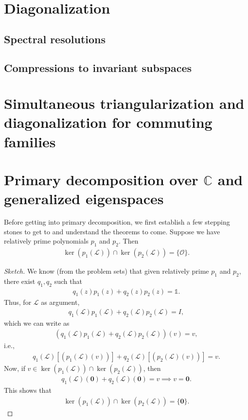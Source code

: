 \documentclass{article}
\theoremstyle{definition}
\newcommand{\lag}{\mathcal{L}}
\begin{document}
\section{Diagonalization}
\subsection{Spectral resolutions}
\subsection{Compressions to invariant subspaces}
\newpage
\section{Simultaneous triangularization and  diagonalization for commuting families}
\newpage
\section{Primary decomposition over $\mathbb{C}$ and generalized eigenspaces}

Before getting into primary decomposition, we first establish a few stepping stones to get to and understand the theorems to come. Suppose we have relatively prime polynomials $p_1$ and $p_2$. Then
\begin{align*}
\ker(p_1(\lag)) \cap \ker(p_2(\lag)) = \{ \mathcal{O} \}.
\end{align*}

\begin{proof}[Sketch]
	We know (from the problem sets) that given relatively prime $p_1$ and $p_2$, there exist $q_1, q_2$ such that 
	\begin{align*}
	q_1(z)p_1(z) + q_2(z)p_2(z) = \mathbb{1}.
	\end{align*}
	Thus, for $\lag$ as argument,
	\begin{align*}
	q_1(\lag)p_1(\lag) + q_2(\lag)p_2(\lag) = I,
	\end{align*}
	which we can write as
	\begin{align*}
	\left(q_1(\lag)p_1(\lag) + q_2(\lag)p_2(\lag)\right)(v) = v,
	\end{align*}
	i.e.,
	\begin{align*}
	q_1(\lag)[(p_1(\lag)(v))] + q_2(\lag)[(p_2(\lag)(v))] = v.
	\end{align*}
	Now, if $v\in \ker(p_1(\lag)) \cap \ker(p_2(\lag))$, then
	\begin{align*}
	q_1(\lag)(\mathbf{0}) + q_2(\lag)(\mathbf{0}) = v \implies v = \mathbf{0}.
	\end{align*} 
	This shows that
	\begin{align*}
	\ker(p_1(\lag)) \cap \ker(p_2(\lag)) = \{ \mathbf{0} \}.
	\end{align*}
\end{proof}
\end{document}
